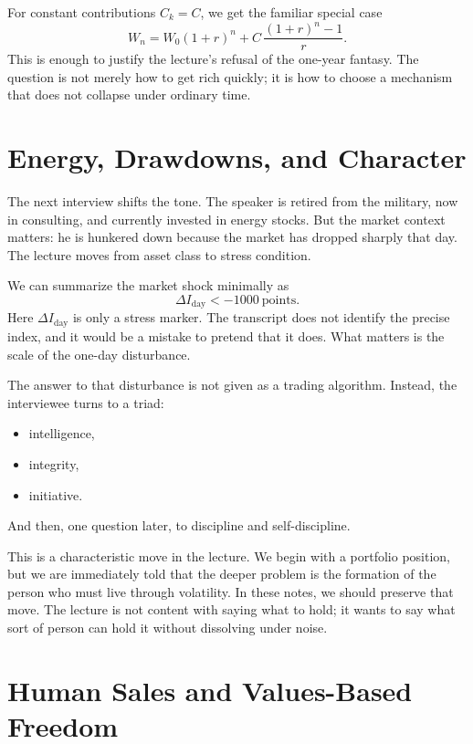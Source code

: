 For constant contributions \(C_k=C\), we get the familiar special case
\begin{equation}
W_n = W_0(1+r)^n + C\,\frac{(1+r)^n-1}{r}.
\end{equation}
This is enough to justify the lecture's refusal of the one-year fantasy. The question is not merely how to get rich quickly; it is how to choose a mechanism that does not collapse under ordinary time.

\section{Energy, Drawdowns, and Character}

The next interview shifts the tone. The speaker is retired from the military, now in consulting, and currently invested in energy stocks. But the market context matters: he is hunkered down because the market has dropped sharply that day. The lecture moves from asset class to stress condition.

We can summarize the market shock minimally as
\begin{equation}
\Delta I_{\text{day}} < -1000 \ \text{points}.
\end{equation}
Here \(\Delta I_{\text{day}}\) is only a stress marker. The transcript does not identify the precise index, and it would be a mistake to pretend that it does. What matters is the scale of the one-day disturbance.

The answer to that disturbance is not given as a trading algorithm. Instead, the interviewee turns to a triad:
\begin{itemize}
\item intelligence,
\item integrity,
\item initiative.
\end{itemize}
And then, one question later, to discipline and self-discipline.

This is a characteristic move in the lecture. We begin with a portfolio position, but we are immediately told that the deeper problem is the formation of the person who must live through volatility. In these notes, we should preserve that move. The lecture is not content with saying what to hold; it wants to say what sort of person can hold it without dissolving under noise.

\section{Human Sales and Values-Based Freedom}

